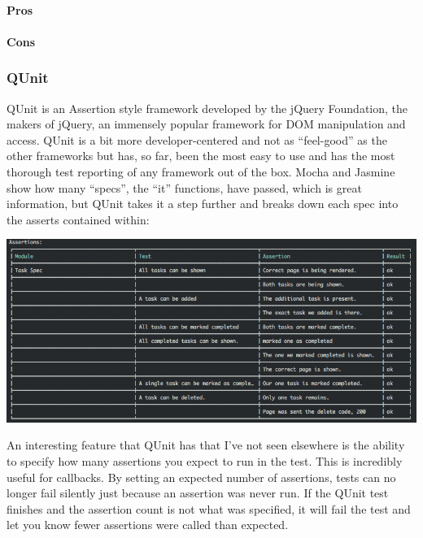 \documentclass[11pt]{article}
\newenvironment{Figure}
  {\par\medskip\noindent\minipage{\linewidth}}
  {\endminipage\par\medskip}
\begin{document}
\paragraph{Pros}

\paragraph{Cons}

\subsubsection{QUnit \cite{QUnit}}
QUnit is an Assertion style framework developed by the jQuery Foundation, the makers of jQuery, an immensely popular framework for DOM manipulation and access. QUnit is a bit more developer-centered and not as ``feel-good'' as the other frameworks but has, so far, been the most easy to use and has the most thorough test reporting of any framework out of the box. Mocha and Jasmine show how many ``specs'', the ``it'' functions, have passed, which is great information, but QUnit takes it a step further and breaks down each spec into the asserts contained within:
\begin{Figure}
  \centering
  \includegraphics[width=\linewidth]{qunitrunner.png} 
\end{Figure}
An interesting feature that QUnit has that I've not seen elsewhere is the ability to specify how many assertions you expect to run in the test. This is incredibly useful for callbacks. By setting an expected number of assertions, tests can no longer fail silently just because an assertion was never run. If the QUnit test finishes and the assertion count is not what was specified, it will fail the test and let you know fewer assertions were called than expected.
\end{document}
